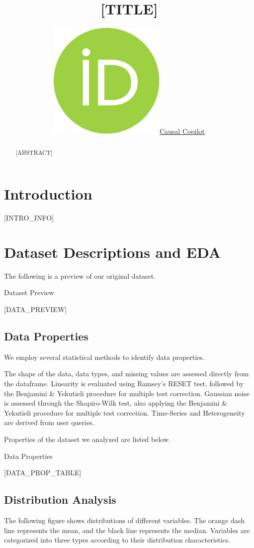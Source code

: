 \documentclass{article}
\title{[TITLE]}
\author{ \href{https://orcid.org/0000-0000-0000-0000}{\includegraphics[scale=0.06]{postprocess/context/orcid.pdf}\hspace{1mm}Causal Copilot}}
\begin{document}
\maketitle

\begin{abstract}
[ABSTRACT]
\end{abstract}


\raggedbottom
\section{Introduction}
[INTRO_INFO]

\section{Dataset Descriptions and EDA}
The following is a preview of our original dataset.

\begin{table}[H]
    \centering
    \caption{Dataset Preview}
    [DATA_PREVIEW]
\end{table}

\subsection{Data Properties}
We employ several statistical methods to identify data properties.

The shape of the data, data types, and missing values are assessed directly from the dataframe.
Linearity is evaluated using Ramsey’s RESET test, followed by the Benjamini \& Yekutieli procedure for multiple test correction.
Gaussian noise is assessed through the Shapiro-Wilk test, also applying the Benjamini \& Yekutieli procedure for multiple test correction.
Time-Series and Heterogeneity are derived from user queries.

Properties of the dataset we analyzed are listed below.

\begin{table}[H]
    \centering
    \caption{Data Properties}
[DATA_PROP_TABLE]
\end{table}


\subsection{Distribution Analysis}
The following figure shows distributions of different variables. The orange dash line represents the mean, 
and the black line represents the median. Variables are categorized into three types according to their distribution characteristics.
\end{document}
